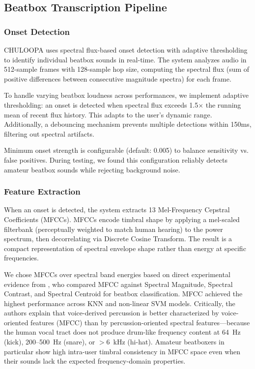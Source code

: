\documentclass{aimc2026}
\begin{document}
\subsection{Beatbox Transcription Pipeline}

\subsubsection{Onset Detection}

CHULOOPA uses spectral flux-based onset detection with adaptive thresholding to identify individual beatbox sounds in real-time. The system analyzes audio in 512-sample frames with 128-sample hop size, computing the spectral flux (sum of positive differences between consecutive magnitude spectra) for each frame.

To handle varying beatbox loudness across performances, we implement adaptive thresholding: an onset is detected when spectral flux exceeds 1.5$\times$ the running mean of recent flux history. This adapts to the user's dynamic range. Additionally, a debouncing mechanism prevents multiple detections within 150ms, filtering out spectral artifacts.

Minimum onset strength is configurable (default: 0.005) to balance sensitivity vs. false positives. During testing, we found this configuration reliably detects amateur beatbox sounds while rejecting background noise.

\subsubsection{Feature Extraction}

When an onset is detected, the system extracts 13 Mel-Frequency Cepstral Coefficients (MFCCs). MFCCs encode timbral shape by applying a mel-scaled filterbank (perceptually weighted to match human hearing) to the power spectrum, then decorrelating via Discrete Cosine Transform. The result is a compact representation of spectral envelope shape rather than energy at specific frequencies.

We chose MFCCs over spectral band energies based on direct experimental evidence from \citet{martanto2025beatbox}, who compared MFCC against Spectral Magnitude, Spectral Contrast, and Spectral Centroid for beatbox classification. MFCC achieved the highest performance across KNN and non-linear SVM models. Critically, the authors explain that voice-derived percussion is better characterized by voice-oriented features (MFCC) than by percussion-oriented spectral features---because the human vocal tract does not produce drum-like frequency content at 64~Hz (kick), 200--500~Hz (snare), or $>$6~kHz (hi-hat). Amateur beatboxers in particular show high intra-user timbral consistency in MFCC space even when their sounds lack the expected frequency-domain properties.
\end{document}
